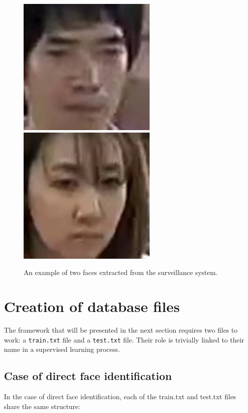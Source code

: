 \begin{figure}[!ht]
  \centering
  \includegraphics[scale=0.7]{figures/face1.jpg}
  \includegraphics[scale=0.7]{figures/face2.jpg}
  \caption[An example of two faces extracted from the surveillance system. On the left, one of the target individuals. On the right, a typical customer of the shopping center.]{An example of two faces extracted from the surveillance system.}
  \label{fig:face}
\end{figure}

\section{Creation of database files}

The framework that will be presented in the next section requires two files to work: a \texttt{train.txt} file and a \texttt{test.txt} file. Their role is trivially linked to their name in a supervised learning process.

\subsection{Case of direct face identification}
 In the case of direct face identification, each of the train.txt and test.txt files share the same structure:

